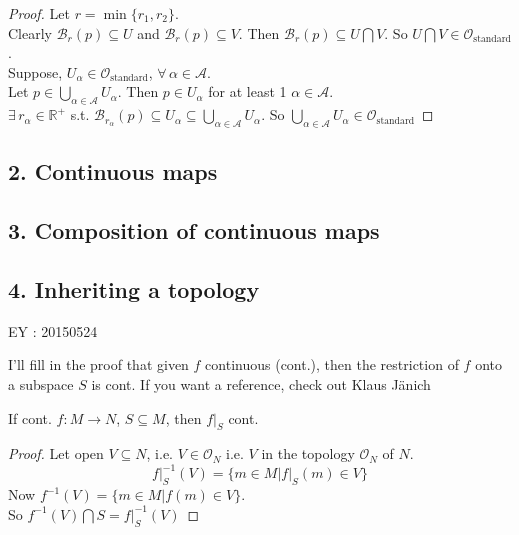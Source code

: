 \documentclass[10pt]{amsart}
\begin{document}
\begin{multicols*}{2}
\begin{proof}
	Let $r=\min{ \lbrace r_1, r_2 \rbrace}$.   \\
	Clearly $\mathcal{B}_r(p) \subseteq U$ and $\mathcal{B}_r(p) \subseteq V$.  Then $\mathcal{B}_r(p) \subseteq U \bigcap V$.  So $U\bigcap V \in \mathcal{O}_{\text{standard}}$.   \\
	
	Suppose, $U_{\alpha} \in \mathcal{O}_{\text{standard}}$, $\forall \, \alpha \in \mathcal{A}$.  \\
	Let $p \in \bigcup_{\alpha \in \mathcal{A}} U_{\alpha}$.  Then $p \in U_{\alpha}$ for at least 1 $\alpha \in \mathcal{A}$.  \\
	\phantom{ \quad \, } $\exists \, r_{\alpha} \in \mathbb{R}^+$ s.t. $\mathcal{B}_{r_{\alpha}}(p) \subseteq U_{\alpha} \subseteq \bigcup_{\alpha \in \mathcal{A}} U_{\alpha}$.  So $\bigcup_{\alpha \in \mathcal{A}} U_{\alpha} \in \mathcal{O}_{\text{standard}}$  
\end{proof}


\subsection{2. Continuous maps}

\subsection{3. Composition of continuous maps}

\subsection{4. Inheriting a topology}


EY : 20150524

I'll fill in the proof that given $f$ continuous (cont.), then the restriction of $f$ onto a subspace $S$ is cont.  If you want a reference, check out Klaus J\"{a}nich \cite[pp. 13, Ch. 1 Fundamental Concepts, Sec. Continuous Maps]{KJanich1995}

If cont. $f: M \to N$, $S \subseteq M$, then $\left. f \right|_S$ cont.  

\begin{proof}
	Let open $V \subseteq N$, i.e. $V \in \mathcal{O}_N$ i.e. $V$ in the topology $\mathcal{O}_N$ of $N$.  
	\[
	\left. f\right|_S^{-1}(V) = \lbrace m \in M | \left. f \right|_S(m) \in V \rbrace
	\]
	Now $f^{-1}(V) = \lbrace m \in M | f(m) \in V \rbrace$. \\
	So $f^{-1}(V) \bigcap S = \left. f \right|_S^{-1}(V)$
	

\end{proof}
\end{multicols*}
\end{document}
